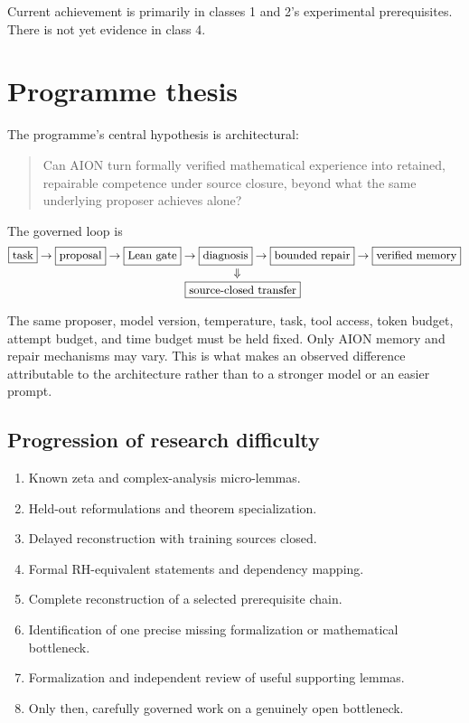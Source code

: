 \documentclass[11pt,a4paper]{article}
\begin{document}
Current achievement is primarily in classes 1 and 2's experimental
prerequisites. There is not yet evidence in class 4.

\section{Programme thesis}

The programme's central hypothesis is architectural:

\begin{quote}
Can AION turn formally verified mathematical experience into retained,
repairable competence under source closure, beyond what the same underlying
proposer achieves alone?
\end{quote}

The governed loop is
\[
\small
\begin{aligned}
\boxed{\text{task}}&\rightarrow\boxed{\text{proposal}}
\rightarrow\boxed{\text{Lean gate}}
\rightarrow\boxed{\text{diagnosis}}
\rightarrow\boxed{\text{bounded repair}}
\rightarrow\boxed{\text{verified memory}}\\[-1mm]
&\hspace{55mm}\Downarrow\\[-1mm]
&\hspace{42mm}\boxed{\text{source-closed transfer}}
\end{aligned}
\]

The same proposer, model version, temperature, task, tool access, token budget,
attempt budget, and time budget must be held fixed. Only AION memory and repair
mechanisms may vary. This is what makes an observed difference attributable to
the architecture rather than to a stronger model or an easier prompt.

\subsection{Progression of research difficulty}

\begin{enumerate}
  \item Known zeta and complex-analysis micro-lemmas.
  \item Held-out reformulations and theorem specialization.
  \item Delayed reconstruction with training sources closed.
  \item Formal RH-equivalent statements and dependency mapping.
  \item Complete reconstruction of a selected prerequisite chain.
  \item Identification of one precise missing formalization or mathematical
  bottleneck.
  \item Formalization and independent review of useful supporting lemmas.
  \item Only then, carefully governed work on a genuinely open bottleneck.
\end{enumerate}
\end{document}
